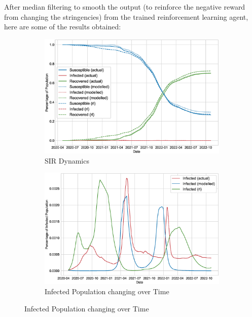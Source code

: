 \documentclass[tikz,fleqn,12pt]{wlscirep}
\begin{document}
After median filtering to smooth the output (to reinforce the negative reward from changing the stringencies) from the trained reinforcement learning agent, here are some of the results obtained:
\begin{figure}[htbp!]
  \centering
  \caption{Strategy from Reinforcement Learning Agent 1}
  \begin{subfigure}[t]{0.48\textwidth}
    \centering
    \includegraphics[width=\linewidth]{images/914857/rl_sir.eps}
    \caption{SIR Dynamics}
  \end{subfigure}
  \label{fig:914857_rl_sir}
  \hfill
  \begin{subfigure}[t]{0.48\textwidth}
    \centering
    \includegraphics[width=\linewidth]{images/914857/rl_i.eps}
    \caption{Infected Population changing over Time}
  \end{subfigure}
  \label{fig:914857_rl_i}


\end{figure}
\end{document}
